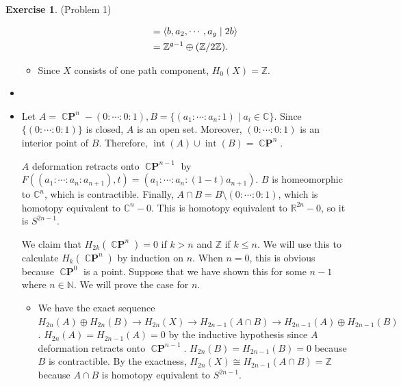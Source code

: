 \documentclass[psamsfonts]{amsart}
\theoremstyle{definition}
\newtheorem*{exer}{Exercise}
\theoremstyle{remark}
\DeclareMathOperator{\Int}{int}
\DeclareMathOperator{\CP}{\mathbb{C}\mathbf{P}}
\numberwithin{equation}{section}
\begin{document}
\begin{exer}{(Problem 1)}
\begin{itemize}
\begin{itemize}
\begin{align*}
               &= \ev{b, a_2, \cdots, a_g \mid 2b} \\
               &= \mathbb{Z}^{g - 1} \oplus (\mathbb{Z}/2\mathbb{Z}).
           \end{align*}
         \item
           Since $X$ consists of one path component, $H_0(X) = \mathbb{Z}$.
       \end{itemize}
     \item
     \item
       Let $A = \CP^n - (0: \cdots : 0:1), B = \{ (a_1: \cdots : a_n:1) \mid a_i \in \mathbb{C} \}$.
       Since $\{ (0: \cdots :0:1) \}$ is closed, $A$ is an open set.
       Moreover, $(0: \cdots :0:1)$ is an interior point of $B$.
       Therefore, $\Int(A) \cup \Int(B) = \CP^n$.

       $A$ deformation retracts onto $\CP^{n - 1}$ by $F((a_1:\cdots :a_n:a_{n + 1}), t) = (a_1:\cdots : a_n:(1 - t)a_{n + 1})$.
       $B$ is homeomorphic to $\mathbb{C}^n$, which is contractible.
       Finally, $A \cap B = B \setminus (0 : \cdots : 0 : 1)$, which is homotopy equivalent to $\mathbb{C}^{n} - 0$.
       This is homotopy equivalent to $\mathbb{R}^{2n} - 0$, so it is $S^{2n - 1}$.

       We claim that $H_{2k}(\CP^n) = 0$ if $k > n$ and $\mathbb{Z}$ if $k \leq n$.
       We will use this to calculate $H_k(\CP^n)$ by induction on $n$.
       When $n = 0$, this is obvious because $\CP^0$ is a point.
       Suppose that we have shown this for some $n - 1$ where $n \in \mathbb{N}$.
       We will prove the case for $n$.
       \begin{itemize}
         \item
           We have the exact sequence $H_{2n}(A) \oplus H_{2n}(B) \rightarrow H_{2n}(X) \rightarrow H_{2n - 1}(A \cap B) \rightarrow H_{2n - 1}(A) \oplus H_{2n - 1}(B)$.
           $H_{2n}(A) = H_{2n - 1}(A) = 0$ by the inductive hypothesis since $A$ deformation retracts onto $\CP^{n - 1}$.
           $H_{2n}(B) = H_{2n - 1}(B) = 0$ because $B$ is contractible.
           By the exactness, $H_{2n}(X) \cong H_{2n - 1}(A \cap B) = \mathbb{Z}$ because $A \cap B$ is homotopy equivalent to $S^{2n - 1}$.
       \end{itemize}

  \end{itemize}
\end{exer}
\end{document}
